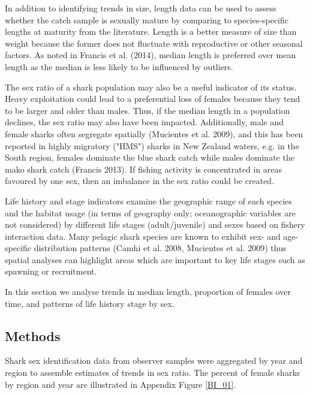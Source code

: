 \documentclass[12pt]{SCreport}
\begin{document}
In addition to identifying trends in size, length data can be used to assess whether the catch sample is sexually mature by comparing to species-specific lengths at maturity from the literature.  Length is a better measure of size than weight because the former does not fluctuate with reproductive or other seasonal factors. As noted in Francis et al. (2014), median length is preferred over mean length as the median is less likely to be influenced by outliers. 

The sex ratio of a shark population may also be a useful indicator of its status. Heavy exploitation could lead to a preferential loss of females because they tend to be larger and older than males. Thus, if the median length in a population declines, the sex ratio may also have been impacted. Additionally, male and female sharks often segregate spatially (Mucientes et al. 2009), and this has been reported in
highly migratory ("HMS") sharks in New Zealand waters, e.g. in the South region, females dominate the blue shark catch while males dominate the mako shark catch (Francis 2013). If fishing activity is concentrated in areas favoured by one sex, then an imbalance in the sex ratio could be created.

Life history and stage indicators examine the geographic range of each species and the habitat usage (in terms of geography only; oceanographic variables are not considered) by different life stages (adult/juvenile) and sexes based on fishery interaction data.  Many pelagic shark species are known to exhibit sex- and age- specific distribution patterns (Camhi et al. 2008, Mucientes et al. 2009) thus spatial analyses can highlight areas which are important to key life stages such as spawning or recruitment.

In this section we analyse trends in median length, proportion of females over time, and patterns of life history stage by sex.  
      

\subsection{Methods}\label{bi:methods}
Shark sex identification data from observer samples were aggregated by year and region to assemble estimates of trends in sex ratio.  The percent of female sharks by region and year are illustrated in Appendix Figure \ref{BI_01}.
  
\end{document}

